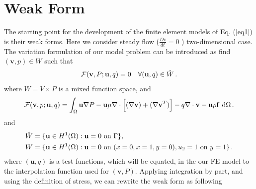 \documentclass[]{article}
\begin{document}
\section{Weak Form} \label{sec: WF}
The starting point for the development of the finite element models of Eq.
(\ref{eq1}) is their weak forms. Here we consider steady flow ($\frac{D v}{d t} =0$ ) two-dimensional
case.  The variation formulation of our model problem can be introduced as find $(\mathbf{v},p) \in W$ such that
\begin{equation}\label{eq4}
	\begin{aligned}
		\mathcal{F}(\mathbf{v},P;\mathbf{u},q) = 0 \quad \forall (\mathbf{u},q) \in \hat{W}\thinspace.
	\end{aligned}
\end{equation}
where $W= V \times P$ is a mixed function space, and 
\begin{equation}\label{eq5}
	\begin{aligned}
		\mathcal{F}(\mathbf{v},p;\mathbf{u},q) =\int_{\Omega} \mathbf{u} \nabla P -\mathbf{u}\mu \nabla \cdot \Big[(\nabla \mathbf{v}) + (\nabla \mathbf{v}^T)  \Big] - q \nabla \cdot \mathbf{v} - \mathbf{u}\rho \mathbf{f}\ \mathrm{d}\Omega \thinspace .
	\end{aligned}
\end{equation}
and
\begin{equation}\label{eq6}
	\begin{aligned}
		\hat{W} &= \{\mathbf{u} \in H^1(\Omega) : \mathbf{u} = 0 \text{ on } \Gamma\}, \\
		W &= \{\mathbf{u} \in H^1(\Omega) : \mathbf{u} = 0 \text{ on } (x=0,x=1,y=0), u_2 = 1 \text{ on } y=1 \}\thinspace.
	\end{aligned}
\end{equation}
where $(\mathbf{u},q)$ is a test functions, which will be equated, in the our FE model to the interpolation function used for $(\mathbf{v},P)$. Applying integration by part, and using the definition of stress, we can rewrite the weak form as following
\end{document}
